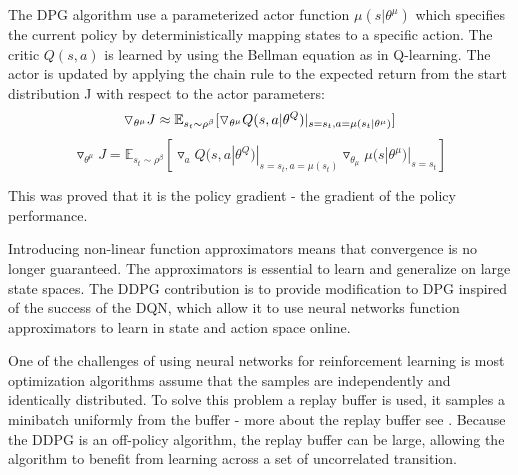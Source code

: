 The DPG algorithm use a parameterized actor function $\mu(s|\theta^\mu)$ which specifies the current policy by deterministically mapping states to a specific action. The critic $Q(s,a)$ is learned by using the Bellman equation as in Q-learning. The actor is updated by applying the chain rule to the expected return from the start distribution J with respect to the actor parameters: 
\begin{equation}
\triangledown_{\theta^\mu} J \approx \mathbb{E}_{s_t \sim \rho^\beta} [\triangledown_{\theta^\mu}Q(s,a|\theta^Q)|_{s=s_t , a=\mu(s_t|\theta^\mu)}]  
\newline
\end{equation}
\begin{equation}
\triangledown_{\theta^\mu} J = \mathbb{E}_{s_t \sim \rho^\beta} [\triangledown_{a}Q(s,a|\theta^Q)|_{s=s_t , a=\mu(s_t)} \triangledown_{\theta_\mu}\mu(s|\theta^\mu)|_{s=s_t} ]
\end{equation} 

This was proved that it is the policy gradient - the gradient of the policy performance. 

Introducing non-linear function approximators means that convergence is no longer guaranteed. The approximators is essential to learn and generalize on large state spaces. The DDPG contribution is to provide modification to DPG inspired of the success of the DQN, which allow it to use neural networks function approximators to learn in state and action space online.  

One of the challenges of using neural networks for reinforcement learning is most optimization algorithms assume that the samples are independently and identically distributed. To solve this problem a replay buffer is used, it samples a minibatch uniformly from the buffer - more about the replay buffer see . Because the DDPG is an off-policy algorithm, the replay buffer can be large, allowing the algorithm to benefit from learning across a set of uncorrelated transition. 

